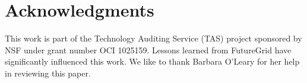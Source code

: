 \documentclass{sig-alternate}
\begin{document}

\section{Acknowledgments}

 
This work is part of the Technology Auditing Service (TAS) project sponsored by NSF under grant number OCI 1025159. Lessons learned from FutureGrid have significantly influenced this work. We like to thank Barbara O'Leary for her help in reviewing this paper.
 
%

% 
 

\end{document}
